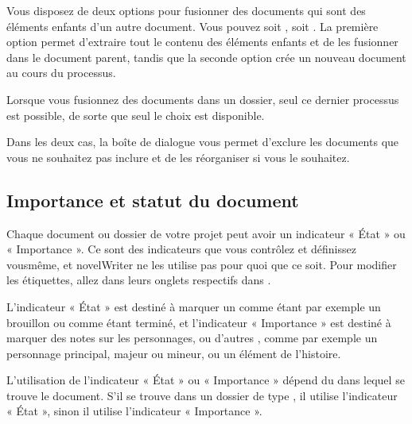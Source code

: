 \documentclass[a4paper,11pt,french]{sphinxmanual}
\begin{document}
\sphinxAtStartPar
Vous disposez de deux options pour fusionner des documents qui sont des éléments enfants d’un autre document. Vous pouvez soit , soit . La première option permet d’extraire tout le contenu des éléments enfants et de les fusionner dans le document parent, tandis que la seconde option crée un nouveau document au cours du processus.

\sphinxAtStartPar
Lorsque vous fusionnez des documents dans un dossier, seul ce dernier processus est possible, de sorte que seul le choix  est disponible.

\sphinxAtStartPar
Dans les deux cas, la boîte de dialogue  vous permet d’exclure les documents que vous ne souhaitez pas inclure et de les réorganiser si vous le souhaitez.


\subsection{Importance et statut du document}
\label{\detokenize{usage_project:document-importance-and-status}}\label{\detokenize{usage_project:a-ui-tree-status}}
\sphinxAtStartPar
Chaque document ou dossier de votre projet peut avoir un indicateur « État » ou « Importance ». Ce sont des indicateurs que vous contrôlez et définissez vous\sphinxhyphen{}même, et novelWriter ne les utilise pas pour quoi que ce soit. Pour modifier les étiquettes, allez dans leurs onglets respectifs dans .

\sphinxAtStartPar
L’indicateur « État » est destiné à marquer un {\hyperref[\detokenize{int_glossary:term-Novel-Documents}]{}} comme étant par exemple un brouillon ou comme étant terminé, et l’indicateur « Importance » est destiné à marquer des notes sur les personnages, ou d’autres {\hyperref[\detokenize{int_glossary:term-Project-Notes}]{}}, comme par exemple un personnage principal, majeur ou mineur, ou un élément de l’histoire.

\sphinxAtStartPar
L’utilisation de l’indicateur « État » ou « Importance » dépend du {\hyperref[\detokenize{int_glossary:term-Root-Folder}]{}} dans lequel se trouve le document. S’il se trouve dans un dossier de type , il utilise l’indicateur « État », sinon il utilise l’indicateur « Importance ».
\end{document}
